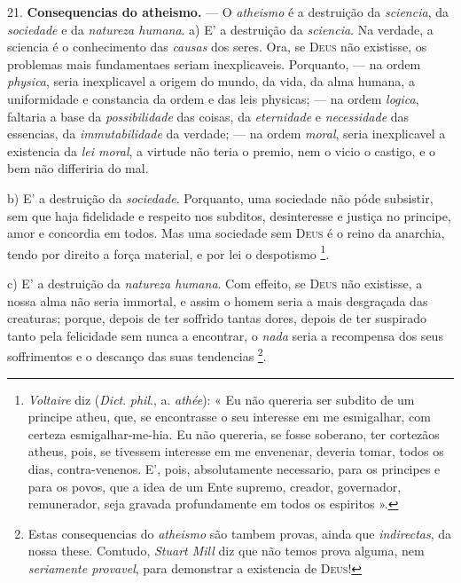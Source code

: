 21. \textbf{Consequencias do atheismo.} --- O \emph{atheismo} é a destruição da \emph{sciencia}, da \emph{sociedade} e da \emph{natureza humana}.
 a) E' a destruição da \emph{sciencia}. Na verdade, a sciencia é o conhecimento das \emph{causas} dos seres. Ora, se \textsc{Deus} não existisse, os problemas mais fundamentaes seriam inexplicaveis. Porquanto, --- na ordem \emph{physica}, seria inexplicavel a origem do mundo, da vida, da alma humana, a uniformidade e constancia da ordem e das leis physicas; --- na ordem \emph{logica}, faltaria a base da \emph{possibilidade} das coisas, da \emph{eternidade} e \emph{necessidade} das essencias, da \emph{immutabilidade} da verdade; --- na ordem \emph{moral}, seria inexplicavel a existencia da \emph{lei moral}, a virtude não teria o premio, nem o vicio o castigo, e o bem não differiria do mal.

b) E' a destruição da \emph{sociedade}. Porquanto, uma sociedade não póde subsistir, sem que haja fidelidade e respeito nos subditos, desinteresse e justiça no principe, amor e concordia em todos. Mas uma sociedade sem \textsc{Deus} é o reino da anarchia, tendo por direito a força material, e por lei o despotismo \footnote{\emph{Voltaire} diz (\emph{Dict}. \emph{phil}., a. \emph{athée}): « Eu não quereria ser subdito de um principe atheu, que, se encontrasse o seu interesse em me esmigalhar, com certeza esmigalhar-me-hia. Eu não quereria, se fosse soberano, ter cortezãos atheus, pois, se tivessem interesse em me envenenar, deveria tomar, todos os dias, contra-venenos. E', pois, absolutamente necessario, para os principes e para os povos, que a idea de um Ente supremo, creador, governador, remunerador, seja gravada profundamente em todos os espiritos ».}.

c) E' a destruição da \emph{natureza humana}. Com effeito, se \textsc{Deus} não existisse, a nossa alma não seria immortal, e assim o homem seria a mais desgraçada das creaturas; porque, depois de ter soffrido tantas dores, depois de ter suspirado tanto pela felicidade sem nunca a encontrar, o \emph{nada} seria a recompensa dos seus soffrimentos e o descanço das suas tendencias \footnote{Estas consequencias do \emph{atheismo} são tambem provas, ainda que \emph{indirectas}, da nossa these. Comtudo, \emph{Stuart Mill} diz que não temos prova alguma, nem \emph{seriamente provavel}, para demonstrar a existencia de \textsc{Deus}!}.
